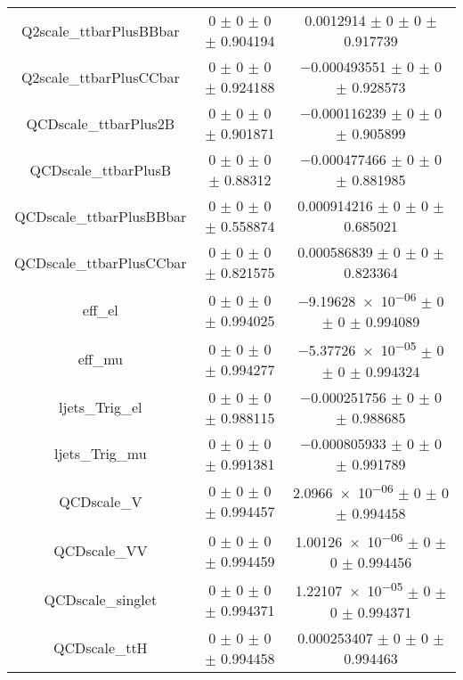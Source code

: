 \begin{table}
\begin{tabular}{ccc}
Q2scale\_ttbarPlusBBbar & \num{0} $\pm$ \num{0} $\pm$ \num{0} $\pm$ \num{0.904194} & \num{0.0012914} $\pm$ \num{0} $\pm$ \num{0} $\pm$ \num{0.917739}\\
Q2scale\_ttbarPlusCCbar & \num{0} $\pm$ \num{0} $\pm$ \num{0} $\pm$ \num{0.924188} & \num{-0.000493551} $\pm$ \num{0} $\pm$ \num{0} $\pm$ \num{0.928573}\\
QCDscale\_ttbarPlus2B & \num{0} $\pm$ \num{0} $\pm$ \num{0} $\pm$ \num{0.901871} & \num{-0.000116239} $\pm$ \num{0} $\pm$ \num{0} $\pm$ \num{0.905899}\\
QCDscale\_ttbarPlusB & \num{0} $\pm$ \num{0} $\pm$ \num{0} $\pm$ \num{0.88312} & \num{-0.000477466} $\pm$ \num{0} $\pm$ \num{0} $\pm$ \num{0.881985}\\
QCDscale\_ttbarPlusBBbar & \num{0} $\pm$ \num{0} $\pm$ \num{0} $\pm$ \num{0.558874} & \num{0.000914216} $\pm$ \num{0} $\pm$ \num{0} $\pm$ \num{0.685021}\\
QCDscale\_ttbarPlusCCbar & \num{0} $\pm$ \num{0} $\pm$ \num{0} $\pm$ \num{0.821575} & \num{0.000586839} $\pm$ \num{0} $\pm$ \num{0} $\pm$ \num{0.823364}\\
eff\_el & \num{0} $\pm$ \num{0} $\pm$ \num{0} $\pm$ \num{0.994025} & \num{-9.19628e-06} $\pm$ \num{0} $\pm$ \num{0} $\pm$ \num{0.994089}\\
eff\_mu & \num{0} $\pm$ \num{0} $\pm$ \num{0} $\pm$ \num{0.994277} & \num{-5.37726e-05} $\pm$ \num{0} $\pm$ \num{0} $\pm$ \num{0.994324}\\
ljets\_Trig\_el & \num{0} $\pm$ \num{0} $\pm$ \num{0} $\pm$ \num{0.988115} & \num{-0.000251756} $\pm$ \num{0} $\pm$ \num{0} $\pm$ \num{0.988685}\\
ljets\_Trig\_mu & \num{0} $\pm$ \num{0} $\pm$ \num{0} $\pm$ \num{0.991381} & \num{-0.000805933} $\pm$ \num{0} $\pm$ \num{0} $\pm$ \num{0.991789}\\
QCDscale\_V & \num{0} $\pm$ \num{0} $\pm$ \num{0} $\pm$ \num{0.994457} & \num{2.0966e-06} $\pm$ \num{0} $\pm$ \num{0} $\pm$ \num{0.994458}\\
QCDscale\_VV & \num{0} $\pm$ \num{0} $\pm$ \num{0} $\pm$ \num{0.994459} & \num{1.00126e-06} $\pm$ \num{0} $\pm$ \num{0} $\pm$ \num{0.994456}\\
QCDscale\_singlet & \num{0} $\pm$ \num{0} $\pm$ \num{0} $\pm$ \num{0.994371} & \num{1.22107e-05} $\pm$ \num{0} $\pm$ \num{0} $\pm$ \num{0.994371}\\
QCDscale\_ttH & \num{0} $\pm$ \num{0} $\pm$ \num{0} $\pm$ \num{0.994458} & \num{0.000253407} $\pm$ \num{0} $\pm$ \num{0} $\pm$ \num{0.994463}\\

\end{tabular}
\end{table}
